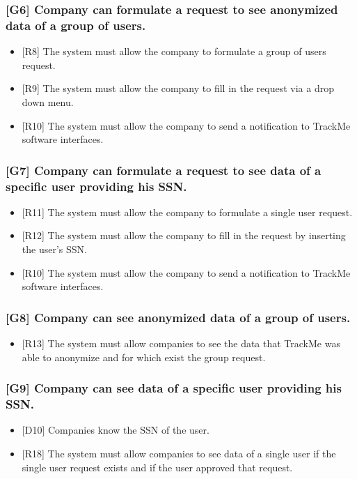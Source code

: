 \documentclass{article}
\begin{document}
\subsubsection{[G6] Company can formulate a request to see anonymized data of a group of users.}
\begin{itemize}
\item {[R8]} The system must allow the company to formulate a group of users request.
\item {[R9]} The system must allow the company to fill in the request via a drop down menu.
\item {[R10]} The system must allow the company to send a notification to TrackMe software interfaces.
\end{itemize}
\subsubsection{[G7] Company can formulate a request to see data of a specific user providing his SSN.}
\begin{itemize}
\item {[R11]} The system must allow the company to formulate a single user request.
\item {[R12]} The system must allow the company to fill in the request by inserting the user's SSN.
\item {[R10]} The system must allow the company to send a notification to TrackMe software interfaces.
\end{itemize}
\subsubsection{[G8] Company can see anonymized data of a group of users.}
\begin{itemize}
\item {[R13]} The system must allow companies to see the data that TrackMe was able to anonymize and for which exist the group request.
\end{itemize}
\subsubsection{[G9] Company can see data of a specific user providing his SSN.}
\begin{itemize}
\item {[D10]} Companies know the SSN of the user.
\item {[R18]} The system must allow companies to see data of a single user if the single user request exists and if the user approved that request.
\end{itemize}
\end{document}
